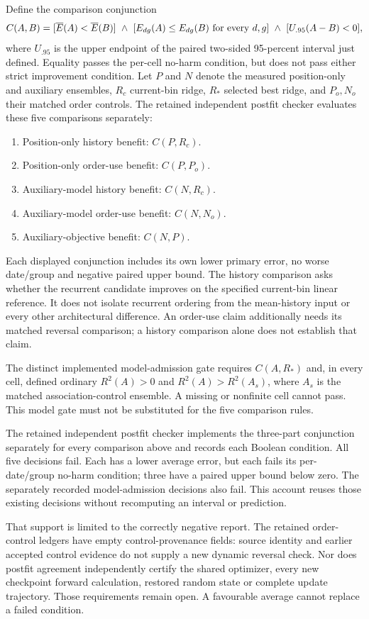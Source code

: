 Define the comparison conjunction
\[
 C(A,B)=
 [\overline E(A)<\overline E(B)]\ \land\
 [E_{dg}(A)\leq E_{dg}(B)\ \hbox{for every }d,g]\ \land\
 [U_{.95}(A-B)<0],
\]
where $U_{.95}$ is the upper endpoint of the paired two-sided 95-percent
interval just defined. Equality passes the per-cell no-harm condition, but
does not pass either strict improvement condition. Let $P$ and $N$ denote
the measured position-only and auxiliary ensembles, $R_c$ current-bin ridge,
$R_*$ selected best ridge, and $P_o,N_o$ their matched order controls.
The retained independent postfit checker evaluates these five comparisons separately:
\begin{enumerate}
 \item Position-only history benefit: $C(P,R_c)$.
 \item Position-only order-use benefit: $C(P,P_o)$.
 \item Auxiliary-model history benefit: $C(N,R_c)$.
 \item Auxiliary-model order-use benefit: $C(N,N_o)$.
 \item Auxiliary-objective benefit: $C(N,P)$.
\end{enumerate}
Each displayed conjunction includes its own lower primary error, no worse
date/group and negative paired upper bound. The history comparison asks
whether the recurrent candidate improves on the specified current-bin linear
reference. It does not isolate recurrent ordering from the mean-history input
or every other architectural difference. An order-use claim additionally
needs its matched reversal comparison; a history comparison alone does not
establish that claim.

The distinct implemented model-admission gate requires $C(A,R_*)$ and, in every
cell, defined ordinary $R^2(A)>0$ and $R^2(A)>R^2(A_s)$, where $A_s$ is the
matched association-control ensemble. A missing or nonfinite cell cannot pass.
This model gate must not be substituted for the five comparison rules.

The retained independent postfit checker implements the three-part conjunction
separately for every comparison above and records each Boolean condition. All
five decisions fail. Each has a lower average error, but each fails its
per-date/group no-harm condition; three have a paired upper bound below zero.
The separately recorded model-admission decisions also fail. This account
reuses those existing decisions without recomputing an interval or prediction.

That support is limited to the correctly negative report. The retained
order-control ledgers have empty control-provenance fields: source identity and
earlier accepted control evidence do not supply a new dynamic reversal check.
Nor does postfit agreement independently certify the shared optimizer, every
new checkpoint forward calculation, restored random state or complete update
trajectory. Those requirements remain open. A favourable average cannot
replace a failed condition.

